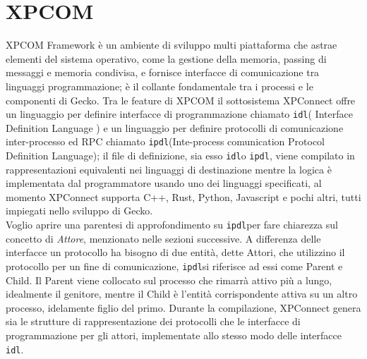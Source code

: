 \documentclass{sapthesis}
\newcommand{\code}[1]{\texttt{#1}}
\newcommand{\idl}{\code{idl}}
\newcommand{\ipdl}{\code{ipdl}}
\begin{document}
    \section{XPCOM}
        XPCOM Framework è un ambiente di sviluppo multi piattaforma che astrae elementi del sistema operativo,
        come la gestione della memoria, passing di messaggi e memoria condivisa, e fornisce interfacce di 
        comunicazione tra linguaggi programmazione; è il collante fondamentale tra i processi e le componenti di
        Gecko. Tra le feature di XPCOM il sottosistema XPConnect offre un linguaggio per definire
        interfacce di programmazione chiamato \idl ( Interface Definition Language ) e un linguaggio per definire protocolli
        di comunicazione inter-processo ed RPC chiamato \ipdl (Inte-process comunication Protocol Definition Language);
        il file di definizione, sia esso \idl o \ipdl, viene compilato in rappresentazioni equivalenti nei linguaggi
        di destinazione mentre la logica è implementata dal programmatore usando uno dei linguaggi specificati,
        al momento XPConnect supporta C++, Rust, Python, Javascript e pochi altri, tutti impiegati nello sviluppo
        di Gecko.\\
        Voglio aprire una parentesi di approfondimento su \ipdl per fare chiarezza sul concetto di \textit{Attore}, 
        menzionato nelle sezioni successive. A differenza delle interfacce un protocollo ha bisogno di due entità,
        dette Attori, che utilizzino il protocollo per un fine di comunicazione, \ipdl si riferisce ad essi come 
        Parent e Child. Il Parent viene collocato sul processo che rimarrà attivo più a lungo, idealmente il genitore, 
        mentre il Child è l'entità corrispondente attiva su un altro processo, idelamente figlio del primo.
        Durante la compilazione, XPConnect genera sia le strutture di rappresentazione dei protocolli che le
        interfacce di programmazione per gli attori, implementate allo stesso modo delle interfacce \idl.
\end{document}
